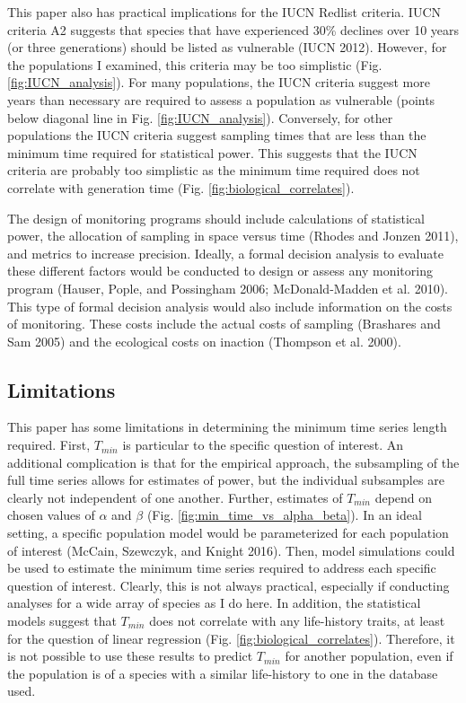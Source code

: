 \documentclass[12pt,]{article}
\begin{document}
\begin{spacing}{2}
This paper also has practical implications for the IUCN Redlist
criteria. IUCN criteria A2 suggests that species that have experienced
30\% declines over 10 years (or three generations) should be listed as
vulnerable (IUCN 2012). However, for the populations I examined, this
criteria may be too simplistic (Fig. \ref{fig:IUCN_analysis}). For many
populations, the IUCN criteria suggest more years than necessary are
required to assess a population as vulnerable (points below diagonal
line in Fig. \ref{fig:IUCN_analysis}). Conversely, for other populations
the IUCN criteria suggest sampling times that are less than the minimum
time required for statistical power. This suggests that the IUCN
criteria are probably too simplistic as the minimum time required does
not correlate with generation time (Fig.
\ref{fig:biological_correlates}).

The design of monitoring programs should include calculations of
statistical power, the allocation of sampling in space versus time
(Rhodes and Jonzen 2011), and metrics to increase precision. Ideally, a
formal decision analysis to evaluate these different factors would be
conducted to design or assess any monitoring program (Hauser, Pople, and
Possingham 2006; McDonald-Madden et al. 2010). This type of formal
decision analysis would also include information on the costs of
monitoring. These costs include the actual costs of sampling (Brashares
and Sam 2005) and the ecological costs on inaction (Thompson et al.
2000).

\subsection{Limitations}\label{limitations}

This paper has some limitations in determining the minimum time series
length required. First, \(T_{min}\) is particular to the specific
question of interest. An additional complication is that for the
empirical approach, the subsampling of the full time series allows for
estimates of power, but the individual subsamples are clearly not
independent of one another. Further, estimates of \(T_{min}\) depend on
chosen values of \(\alpha\) and \(\beta\) (Fig.
\ref{fig:min_time_vs_alpha_beta}). In an ideal setting, a specific
population model would be parameterized for each population of interest
(McCain, Szewczyk, and Knight 2016). Then, model simulations could be
used to estimate the minimum time series required to address each
specific question of interest. Clearly, this is not always practical,
especially if conducting analyses for a wide array of species as I do
here. In addition, the statistical models suggest that \(T_{min}\) does
not correlate with any life-history traits, at least for the question of
linear regression (Fig. \ref{fig:biological_correlates}). Therefore, it
is not possible to use these results to predict \(T_{min}\) for another
population, even if the population is of a species with a similar
life-history to one in the database used.


\end{spacing}
\end{document}
